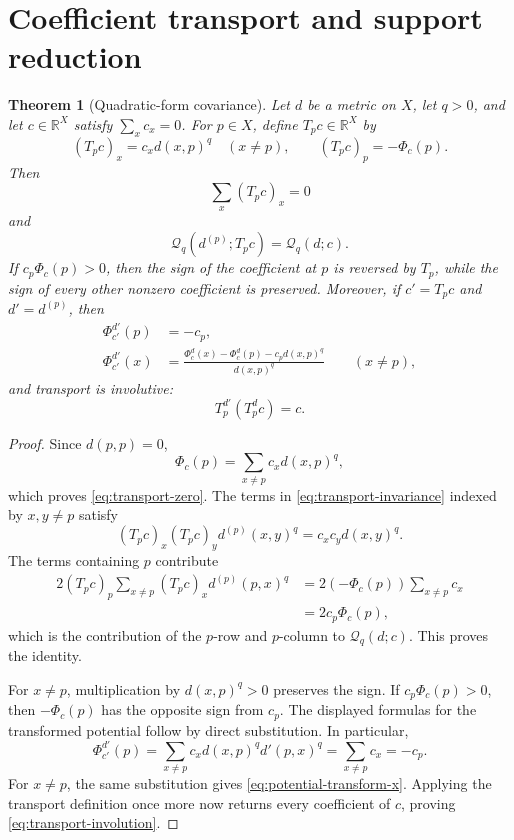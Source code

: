\documentclass[11pt]{amsart}
\newtheorem{theorem}{Theorem}[section]
\theoremstyle{definition}
\theoremstyle{remark}
\newcommand{\R}{\mathbb R}
\newcommand{\Qform}{\mathcal Q}
\begin{document}
\section{Coefficient transport and support reduction}

\begin{theorem}[Quadratic-form covariance]\label{thm:transport}
Let $d$ be a metric on $X$, let $q>0$, and let $c\in\R^X$ satisfy
$\sum_xc_x=0$.  For $p\in X$, define $T_pc\in\R^X$ by
\begin{equation}\label{eq:transport}
 (T_pc)_x=c_xd(x,p)^q\quad(x\ne p),
 \qquad
 (T_pc)_p=-\Phi_c(p).
\end{equation}
Then
\begin{equation}\label{eq:transport-zero}
 \sum_x(T_pc)_x=0
\end{equation}
and
\begin{equation}\label{eq:transport-invariance}
 \boxed{\Qform_q(d^{(p)};T_pc)=\Qform_q(d;c).}
\end{equation}
If $c_p\Phi_c(p)>0$, then the sign of the coefficient at $p$ is reversed by
$T_p$, while the sign of every other nonzero coefficient is preserved.
Moreover, if $c'=T_pc$ and $d'=d^{(p)}$, then
\begin{align}
 \Phi_{c'}^{d'}(p)&=-c_p,\label{eq:potential-transform-p}\\
 \Phi_{c'}^{d'}(x)
 &=\frac{\Phi_c^d(x)-\Phi_c^d(p)-c_p d(x,p)^q}{d(x,p)^q}
 \qquad(x\ne p),\label{eq:potential-transform-x}
\end{align}
and transport is involutive:
\begin{equation}\label{eq:transport-involution}
 T_p^{d'}(T_p^d c)=c.
\end{equation}
\end{theorem}

\begin{proof}
Since $d(p,p)=0$,
\[
 \Phi_c(p)=\sum_{x\ne p}c_xd(x,p)^q,
\]
which proves \eqref{eq:transport-zero}.  The terms in
\eqref{eq:transport-invariance} indexed by $x,y\ne p$ satisfy
\[
 (T_pc)_x(T_pc)_y d^{(p)}(x,y)^q
 =c_xc_y d(x,y)^q.
\]
The terms containing $p$ contribute
\begin{align*}
 2(T_pc)_p\sum_{x\ne p}(T_pc)_x d^{(p)}(p,x)^q
 &=2(-\Phi_c(p))\sum_{x\ne p}c_x\\
 &=2c_p\Phi_c(p),
\end{align*}
which is the contribution of the $p$-row and $p$-column to
$\Qform_q(d;c)$.  This proves the identity.

For $x\ne p$, multiplication by $d(x,p)^q>0$ preserves the sign.  If
$c_p\Phi_c(p)>0$, then $-\Phi_c(p)$ has the opposite sign from $c_p$.
The displayed formulas for the transformed potential follow by direct
substitution.  In particular,
\[
 \Phi_{c'}^{d'}(p)
 =\sum_{x\ne p}c_xd(x,p)^q d'(p,x)^q
 =\sum_{x\ne p}c_x=-c_p.
\]
For $x\ne p$, the same substitution gives
\eqref{eq:potential-transform-x}.  Applying the transport definition once
more now returns every coefficient of $c$, proving
\eqref{eq:transport-involution}.
\end{proof}
\end{document}
